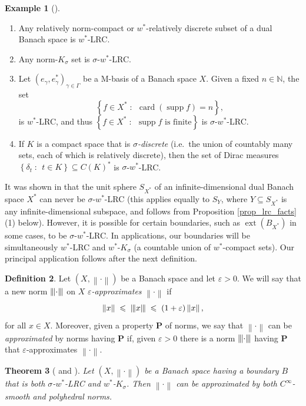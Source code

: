 \documentclass[12pt,reqno]{amsart}
\newcommand{\ep}{\varepsilon}
\newcommand{\n}[1]{\ensuremath{\left\|{#1}\right\|}}
\newcommand{\N}{\mathbb{N}}
\newcommand{\ndot}{\ensuremath{\left\|\cdot\right\|}}
\newcommand{\set}[2]{\ensuremath{\left\{{#1}\;:\;\,{#2}\right\}}}
\newcommand{\tn}[1]{\ensuremath{\left|\kern-.9pt\left|\kern-.9pt\left|{#1}\right|\kern-.9pt\right|\kern-.9pt\right|}}
\newcommand{\tndot}{\ensuremath{\left|\kern-.9pt\left|\kern-.9pt\left|\cdot\right|\kern-.9pt\right|\kern-.9pt\right|}}
\DeclareMathOperator{\card}{card}
\DeclareMathOperator{\ext}{ext}
\DeclareMathOperator{\supp}{supp}
\newtheorem{thm}{Theorem}[section]
\theoremstyle{definition}
\newtheorem{defn}[thm]{Definition}
\newtheorem{example}[thm]{Example}
\begin{document}
\begin{example}[{\cite[Example 6 and Proposition 20]{fpst:14}}]\label{weakstarlrcex}~
\begin{enumerate}
\item Any relatively norm-compact or $w^*$-relatively discrete subset of a dual Banach space is $w^*$-LRC.
\item Any norm-$K_\sigma$ set is $\sigma$-$w^*$-LRC.
\item Let $(e_\gamma,e_\gamma^*)_{\gamma \in \Gamma}$ be a M-basis of a Banach space $X$. Given a fixed $n \in \N$, the set
\[
\set{f \in X^*}{\card(\supp f) = n},
\]
is $w^*$-LRC, and thus $\set{f \in X^*}{\supp f \text{ is finite}}$ is $\sigma$-$w^*$-LRC.
\item If $K$ is a compact space that is \emph{$\sigma$-discrete} (i.e.~the union of countably many sets, each of which is relatively discrete), then the set of Dirac measures $\set{\delta_t}{t \in K} \subseteq C(K)^*$ is $\sigma$-$w^*$-LRC.
\end{enumerate}
\end{example}

It was shown in \cite[p.\ 254]{fpst:14} that the unit sphere $S_{X^*}$ of an infinite-dimensional dual Banach space $X^*$ can never be $\sigma$-$w^*$-LRC (this applies equally to $S_Y$, where $Y \subseteq S_{X^*}$ is any infinite-dimensional subspace, and follows from Proposition \ref{prop_lrc_facts} (1) below). However, it is possible for certain boundaries, such as $\ext(B_{X^*})$ in some cases, to be $\sigma$-$w^*$-LRC. In applications, our boundaries will be simultaneously $w^*$-LRC and $w^*$-$K_\sigma$ (a countable union of $w^*$-compact sets). Our principal application follows after the next definition.

\begin{defn}\label{epapprox}
Let $(X,\ndot)$ be a Banach space and let $\ep>0$. We will say that a new norm $\tndot$ on $X$ {\em $\ep$-approximates}
$\ndot$ if 
\[
\n{x} \;\leqslant\; \tn{x} \;\leqslant\; (1+\ep)\n{x}, 
\]
for all $x \in X$. Moreover, given a property $\mathbf{P}$ of norms, we say that $\ndot$ can be {\em approximated} by norms having $\mathbf{P}$ if, given $\ep>0$ there is a norm $\tndot$ having $\mathbf{P}$ that $\ep$-approximates $\ndot$.
\end{defn}

\begin{thm}[{\cite[Theorem 2.1]{bible:14}} and {\cite[Theorem 7]{fpst:14}}]\label{tb}
Let $(X,\ndot)$ be a Banach space having a boundary $B$ that is both $\sigma$-$w^*$-LRC and $w^*$-$K_\sigma$. Then $\ndot$ can be approximated by both $C^\infty$-smooth and polyhedral norms.
\end{thm}
\end{document}
